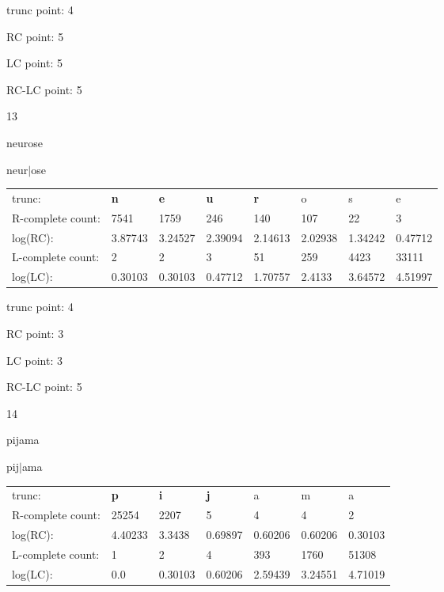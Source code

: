 \documentclass{article}
\begin{document}
trunc point: 4

RC point: 5

LC point: 5

RC-LC point: 5

\vspace{3em}



13

neurose

neur$|$ose

\vspace{1em}

\begin{tabular}{l|lllllll}

trunc: & {\color{red}\bf n} & {\color{red}\bf e} & {\color{red}\bf u} & {\color{red}\bf r} & o & s & e \\ 
R-complete count: & 7541 & 1759 & 246 & 140 & 107 & 22 & 3 \\ 
log(RC): & 3.87743 & 3.24527 & 2.39094 & 2.14613 & 2.02938 & 1.34242 & 0.47712 \\ 
L-complete count: & 2 & 2 & 3 & 51 & 259 & 4423 & 33111 \\ 
log(LC): & 0.30103 & 0.30103 & 0.47712 & 1.70757 & 2.4133 & 3.64572 & 4.51997 \\ 
\end{tabular}

trunc point: 4

RC point: 3

LC point: 3

RC-LC point: 5

\vspace{3em}



14

pijama

pij$|$ama

\vspace{1em}

\begin{tabular}{l|llllll}

trunc: & {\color{red}\bf p} & {\color{red}\bf i} & {\color{red}\bf j} & a & m & a \\ 
R-complete count: & 25254 & 2207 & 5 & 4 & 4 & 2 \\ 
log(RC): & 4.40233 & 3.3438 & 0.69897 & 0.60206 & 0.60206 & 0.30103 \\ 
L-complete count: & 1 & 2 & 4 & 393 & 1760 & 51308 \\ 
log(LC): & 0.0 & 0.30103 & 0.60206 & 2.59439 & 3.24551 & 4.71019 \\ 
\end{tabular}
\end{document}
